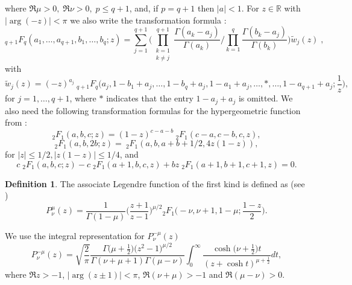 \documentclass[a4paper,11pt]{amsart}
\theoremstyle{definition}
\newtheorem{defn}[theorem]{Definition}
\begin{document}
where $\Re \mu>0,\; \Re \nu>0,\; p\le q+1$,\; and, if $p=q+1$ then $|a|<1$.
For $z\in \mathbb{R}$ with $|\arg({-z})|< \pi$ we also write the transformation formula \cite[(16.8.8)]{NIST}:
$$_{q+1}F_q(a_1, \dots ,a_{q+1},b_1, \dots ,b_q;z)=\sum_{j=1}^{q+1}\Bigg(\prod_{\substack{k=1 \\ k \neq j}}^{q+1}\frac{\Gamma(a_k-a_j)}{\Gamma(a_k)}\Bigg/ \prod_{k=1}^q\frac{\Gamma(b_k-a_j)}{\Gamma(b_k)}\Bigg)\widetilde{w}_j(z) \; ,$$
with $$\widetilde{w}_j(z)=(-z)^{a_j}\:_{q+1}F_q\Big(a_j,1-b_1+a_j, \dots ,1-b_q+a_j, 1-a_1+a_j,\dots, *, \dots , 1-a_{q+1}+a_j;\frac{1}{z}\Big),$$
for $j=1, \dots , q+1$, where $*$ indicates that the entry $1-a_j+a_j$ is omitted.
We also need the following transformation formulas for the hypergeometric function from \cite[pp. 1008--1010, 9.131.3, 9.133.3, 9.137.12]{gradshteyn2007}:
\begin{equation}\label{9.131}
    _2F_{1}(a,b,c;z)=(1-z)^{c-a-b}\:_2F_1(c-a,c-b,c,z),  
\end{equation}
\begin{equation}\label{9.133}
     _2F_{1}(a,b,2b;z)=\:_2F_1(a,b,a+b+1/2,4z(1-z)),  
\end{equation}
for $|z|\le1/2,|z(1-z)|\le1/4$, and 
\begin{equation}\label{9.137}
    c\;_2F_{1}(a,b,c;z)-c\;_2F_1(a+1,b,c,z)+bz\;_2F_1(a+1,b+1,c+1,z)=0.
\end{equation}

\begin{defn}
The associate Legendre function of the first kind is defined as (see \cite[eq. 8.704]{gradshteyn2007})
\begin{equation}\label{Leg}
P_{\nu}^{\mu}(z)=\frac{1}{\Gamma(1-\mu)}\Bigg(\frac{z+1}{z-1}\Bigg)^{\mu/2}{}_2F_1\Bigg(-\nu,\nu+1,1-\mu;\frac{1-z}{2}\Bigg).
\end{equation}
\end{defn}
We use the integral representation for $P_{\nu}^{-\mu}(z)$ \cite[eq. 8.713.3]{gradshteyn2007}
$$P_{\nu}^{-\mu}(z)=\sqrt{\frac{2}{\pi}}\frac{\Gamma\big(\mu+\frac{1}{2}\big)\big(z^2-1)^{\mu/2}}{\Gamma(\nu+\mu+1)\Gamma(\mu-\nu)}\int_{0}^{\infty} \frac{\cosh\big(\nu+\frac{1}{2}\big)t}{(z+\cosh t)^{\mu+\frac{1}{2}}}dt,$$
where $\Re z>-1$,\; $|\arg(z\pm 1)|<\pi$, $\Re(\nu+\mu)>-1$ and $\Re(\mu-\nu)>0$.


\nocite{*}
\printbibliography 
\end{document}

